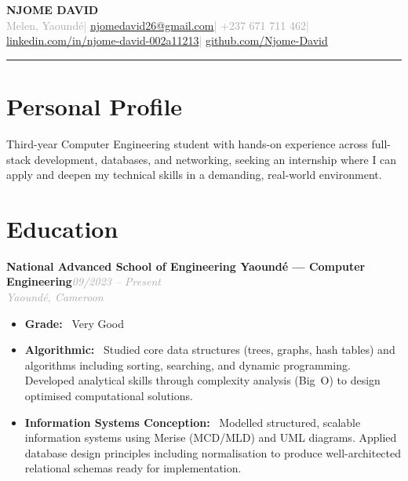 \documentclass[10pt, a4paper]{article}
\newcommand{\entryhead}[2]{%
  \noindent\textbf{#1}\hfill{\small\textit{\textcolor{darkgray}{#2}}}\\[-4pt]%
}
\newcommand{\entrysub}[1]{%
  {\small\textit{\textcolor{darkgray}{#1}}}\\[2pt]%
}
\newcommand{\blabel}[1]{\textbf{#1}\ }
\begin{document}

{\LARGE\bfseries\color{navyblue} NJOME DAVID}\\[4pt]
{\small\textcolor{darkgray}{%
  Melen, Yaoundé\quad|\quad
  \href{mailto:njomedavid26@gmail.com}{njomedavid26@gmail.com}\quad|\quad
  +237 671 711 462\quad|\quad
  \href{https://www.linkedin.com/in/njome-david-002a11213}{linkedin.com/in/njome-david-002a11213}\quad|\quad
  \href{https://github.com/Njome-David}{github.com/Njome-David}
}}

\vspace{4pt}
\textcolor{navyblue}{\rule{\linewidth}{1.8pt}}
\vspace{2pt}

\section{Personal Profile}

Third-year Computer Engineering student with hands-on experience across full-stack development,
databases, and networking, seeking an internship where I can apply and deepen my technical skills
in a demanding, real-world environment.

\section{Education}

\entryhead{National Advanced School of Engineering Yaoundé — Computer Engineering}{09/2023 -- Present}
\entrysub{Yaoundé, Cameroon}
\begin{itemize}
  \item \blabel{Grade:} Very Good
  \item \blabel{Algorithmic:} Studied core data structures (trees, graphs, hash tables) and
        algorithms including sorting, searching, and dynamic programming. Developed analytical
        skills through complexity analysis (Big~O) to design optimised computational solutions.
  \item \blabel{Information Systems Conception:} Modelled structured, scalable information systems
        using Merise (MCD/MLD) and UML diagrams. Applied database design principles including
        normalisation to produce well-architected relational schemas ready for implementation.
\end{itemize}
\end{document}
